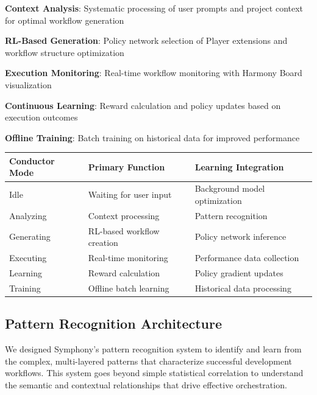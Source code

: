 \begin{expandedlist}
    \item \textbf{Context Analysis}: Systematic processing of user prompts and project context for optimal workflow generation
    \item \textbf{RL-Based Generation}: Policy network selection of Player extensions and workflow structure optimization
    \item \textbf{Execution Monitoring}: Real-time workflow monitoring with Harmony Board visualization
    \item \textbf{Continuous Learning}: Reward calculation and policy updates based on execution outcomes
    \item \textbf{Offline Training}: Batch training on historical data for improved performance
\end{expandedlist}

\begin{center}
\begin{tabular}{@{}lll@{}}
\toprule
\textbf{Conductor Mode} & \textbf{Primary Function} & \textbf{Learning Integration} \\
\midrule
Idle & Waiting for user input & Background model optimization \\
Analyzing & Context processing & Pattern recognition \\
Generating & RL-based workflow creation & Policy network inference \\
Executing & Real-time monitoring & Performance data collection \\
Learning & Reward calculation & Policy gradient updates \\
Training & Offline batch learning & Historical data processing \\
\bottomrule
\end{tabular}
\end{center}

\subsection*{Pattern Recognition Architecture}

We designed Symphony's pattern recognition system to identify and learn from the complex, multi-layered patterns that characterize successful development workflows. This system goes beyond simple statistical correlation to understand the semantic and contextual relationships that drive effective orchestration.

